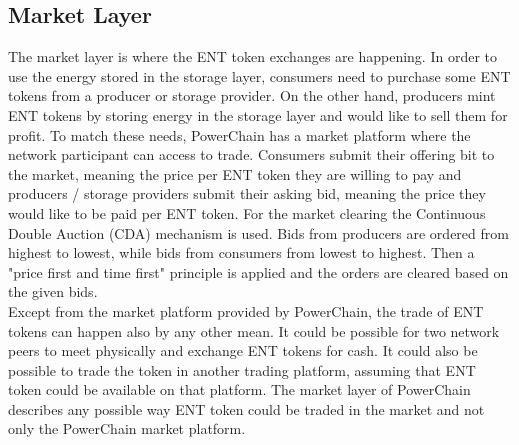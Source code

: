 \subsection{Market Layer}
The market layer is where the ENT token exchanges are happening. In order to use the energy stored in the storage layer, consumers need to purchase some ENT tokens from a producer or storage provider.
On the other hand, producers mint ENT tokens by storing energy in the storage layer and would like to sell them for profit. To match these needs, PowerChain has a market platform
where the network participant can access to trade. Consumers submit their offering bit to the market, meaning the price per ENT token they are willing to pay and producers / storage providers submit
their asking bid, meaning the price they would like to be paid per ENT token. For the market clearing the Continuous Double Auction (CDA) mechanism is used. Bids from producers are
ordered from highest to lowest, while bids from consumers from lowest to highest. Then a "price first and time first" principle is applied and the orders are cleared based on the given
bids.\\
Except from the market platform provided by PowerChain, the trade of ENT tokens can happen also by any other mean. It could be possible for two network peers to meet physically and
exchange ENT tokens for cash. It could also be possible to trade the token in another trading platform, assuming that ENT token could be available on that platform. The market layer of PowerChain 
describes any possible way ENT token could be traded in the market and not only the PowerChain market platform.

